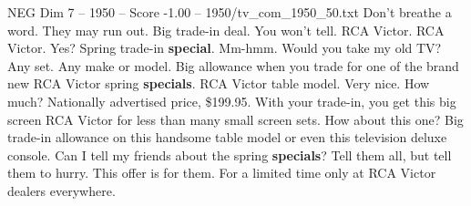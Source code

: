 \begin{textsample}{NEG Dim 7 – 1950 – Score -1.00 – 1950/tv\_com\_1950\_50.txt}  \label{ex:f7_neg_084}
Don't breathe a word.
They may run out.
Big trade-in deal.
You won't tell.
RCA Victor.
RCA Victor.
Yes?
Spring trade-in \textbf{special}.
Mm-hmm.
Would you take my old TV?
Any set.
Any make or model.
Big allowance when you trade for one of the brand new RCA Victor spring \textbf{specials}.
RCA Victor table model.
Very nice.
How much?
Nationally advertised price, \$199.95.
With your trade-in, you get this big screen RCA Victor for less than many small screen sets.
How about this one?
Big trade-in allowance on this handsome table model or even this television deluxe console.
Can I tell my friends about the spring \textbf{specials}?
Tell them all, but tell them to hurry.
This offer is for them.
For a limited time only at RCA Victor dealers everywhere.

\end{textsample}

